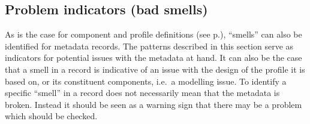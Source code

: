\subsection{Problem indicators (bad smells)} \label{authoring-bad-smells}

As is the case for component and profile definitions (see p.\pageref{modelling-bad-smells}), ``smells'' can also be identified for metadata records. The patterns described in this section serve as indicators for potential issues with the metadata at hand. It can also be the case that a smell in a record is indicative of an issue with the design of the profile it is based on, or its constituent components, i.e.~a modelling issue. To identify a specific
``smell'' in a record does not necessarily mean that the metadata is broken. Instead it should be seen as a warning sign that there may be a problem which should be checked.

